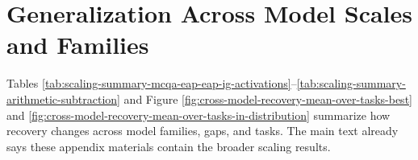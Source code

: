 \documentclass{article} %
\begin{document}
\FloatBarrier



\section{Generalization Across Model Scales and Families}
Tables \ref{tab:scaling-summary-mcqa-eap-eap-ig-activations}--\ref{tab:scaling-summary-arithmetic-subtraction} and Figure \ref{fig:cross-model-recovery-mean-over-tasks-best} and \ref{fig:cross-model-recovery-mean-over-tasks-in-distribution} summarize how recovery changes across model families, gaps, and tasks. The main text already says these appendix materials contain the broader scaling results.






\begin{table}[!t]
\centering
{}
\caption{Model scaling summary for MCQA. Best aligned performance for this task using CPR. Recovery\% $= \frac{\text{Aligned(best)}}{\text{Gold}}\times 100$.}
\label{tab:scaling-summary-mcqa-eap-eap-ig-activations}
\end{table}
\end{document}
